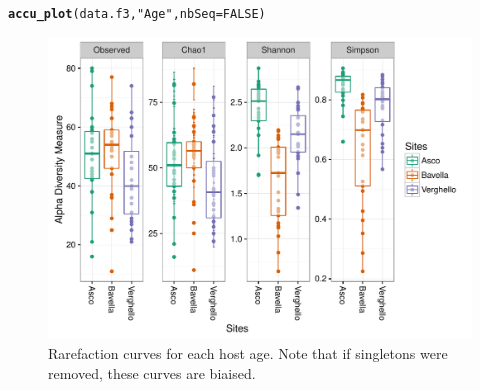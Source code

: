 \documentclass[12pt]{article}\usepackage[]{graphicx}\usepackage[]{color}
\makeatletter
\def\maxwidth{ %
  \ifdim\Gin@nat@width>\linewidth
    \linewidth
  \else
    \Gin@nat@width
  \fi
}
\newcommand{\hlnum}[1]{\textcolor[rgb]{0.686,0.059,0.569}{#1}}%
\newcommand{\hlstr}[1]{\textcolor[rgb]{0.192,0.494,0.8}{#1}}%
\newcommand{\hlstd}[1]{\textcolor[rgb]{0.345,0.345,0.345}{#1}}%
\newcommand{\hlkwc}[1]{\textcolor[rgb]{0.333,0.667,0.333}{#1}}%
\newcommand{\hlkwd}[1]{\textcolor[rgb]{0.737,0.353,0.396}{\textbf{#1}}}%
\newenvironment{kframe}{%
 \def\at@end@of@kframe{}%
 \ifinner\ifhmode%
  \def\at@end@of@kframe{\end{minipage}}%
  \begin{minipage}{\columnwidth}%
 \fi\fi%
 \def\FrameCommand##1{\hskip\@totalleftmargin \hskip-\fboxsep
 \colorbox{shadecolor}{##1}\hskip-\fboxsep
     \hskip-\linewidth \hskip-\@totalleftmargin \hskip\columnwidth}%
 \MakeFramed {\advance\hsize-\width
   \@totalleftmargin\z@ \linewidth\hsize
   \@setminipage}}%
 {\par\unskip\endMakeFramed%
 \at@end@of@kframe}
\newenvironment{knitrout}{}{} %
\numberwithin{figure}{section}
\makeatother
\begin{document}
\begin{knitrout}\small
{}\color{fgcolor}\begin{kframe}
\begin{alltt}
\hlkwd{accu_plot}\hlstd{(data.f3,} \hlstr{"Age"}\hlstd{,} \hlkwc{nbSeq} \hlstd{=} \hlnum{FALSE}\hlstd{)}
\end{alltt}
\end{kframe}\begin{figure}

{\centering \includegraphics[width=\maxwidth]{figure/unnamed-chunk-37-1} 

}

\caption[Rarefaction curves for each host age]{Rarefaction curves for each host age. Note that if singletons were removed, these curves are biaised.}\label{fig:unnamed-chunk-37}
\end{figure}


\end{knitrout}
\end{document}
